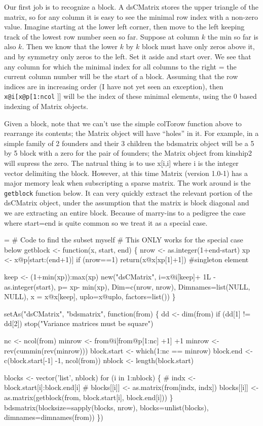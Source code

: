\documentclass{article}
\begin{document}
Our first job is to recognize a block. 
A dsCMatrix stores the upper triangle of the matrix, so for
any column it is easy to see the minimal row index with a 
non-zero value.
Imagine starting at the lower left corner, then move to the
left keeping track of the lowest row number seen so far.
Suppose at column $k$ the min so far is also $k$.  Then we
know that the lower $k$ by $k$ block must have only zeros
above it, and by symmetry only zeros to the left.  Set it
aside and start over.  We see that
any column for which the minimal index for all columns to the
right = the current column number will be
the start of a block.
Assuming that the row indices are in increasing
order (I have not yet seen an exception),
then \Verb!x@i[x@p[1:ncol! ]] will be the index of these minimal elements,
using the 0 based indexing of Matrix objects.

Given a block, note that we can't use the simple colTorow function     %
above to rearrange its contents; the Matrix object will have ``holes'' in it.
For example, in a simple family of 2 founders and their 3 children
the bdsmatrix object will be a 5 by 5 block with a zero for the
pair of founders; the Matrix object from kinship2 will supress the
zero.  
The natrual thing is to use x[i,i] where i is the integer vector
delimiting the block.  
However, at this time Matrix (version 1.0-1) has a major memory
leak when subscripting a sparse matrix.
The work around is the \Verb!getblock! function below.
It can very quickly extract the relevant portion of the
dsCMatrix object, under the assumption that the matrix is block
diagonal and we are extracting an entire block.
Because of marry-ins to a pedigree the case where start=end is
quite common so we treat it as a special case.
\begin{nwchunk}
=
 # Code to find the subset myself
 #  This ONLY works for the special case below
 getblock <- function(x, start, end) \{
     nrow <-  as.integer(1+end-start)
     xp <- x@p[start:(end+1)]
     if (nrow==1) return(x@x[xp[1]+1])  #singleton element
 
     keep <- (1+min(xp)):max(xp)   
     new("dsCMatrix", i=x@i[keep]+ 1L - as.integer(start), 
         p= xp- min(xp), 
         Dim=c(nrow, nrow), Dimnames=list(NULL, NULL),
         x = x@x[keep], uplo=x@uplo, factors=list())
 \}
 
 setAs("dsCMatrix", "bdsmatrix", function(from) \{
     dd <- dim(from)
     if (dd[1] != dd[2]) stop("Variance matrices must be square")
 
     nc <- ncol(from)
     minrow <- from@i[from@p[1:nc] +1] +1
     minrow <- rev(cummin(rev(minrow)))
     block.start <- which(1:nc == minrow)
     block.end <- c(block.start[-1] -1, ncol(from))
     nblock <- length(block.start)
                      
     blocks <- vector('list', nblock)  
     for (i in 1:nblock) \{
 #        indx <- block.start[i]:block.end[i]
 #        blocks[[i]] <- as.matrix(from[indx, indx])
         blocks[[i]] <- as.matrix(getblock(from, block.start[i], block.end[i]))
     \}
     bdsmatrix(blocksize=sapply(blocks, nrow), blocks=unlist(blocks), 
               dimnames=dimnames(from))
     \})
\end{nwchunk}
\end{document}
